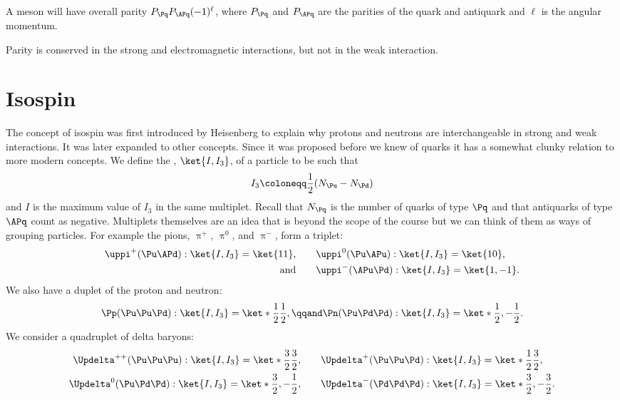 \documentclass[fleqn]{NotesClass}
\makeatletter
\newcommand{\PBASE@pion}{\uppi}
\newcommand{\Ppiplus}{\ensuremath{\PBASE@pion^+}}
\newcommand{\Ppiminus}{\ensuremath{\PBASE@pion^-}}
\newcommand{\Ppineutral}{\ensuremath{\PBASE@pion^0}}
\newcommand{\Ppizero}{\Ppineutral}
\newcommand{\PBASE@Delta}{\Updelta}
\newcommand{\PDeltazero}{\ensuremath{\PBASE@Delta^0}}
\newcommand{\PDeltapp}{\ensuremath{\PBASE@Delta^{++}}}
\newcommand{\PDeltap}{\ensuremath{\PBASE@Delta^+}}
\newcommand{\PDeltam}{\ensuremath{\PBASE@Delta^-}}
\makeatother
\begin{document}
    A meson will have overall parity \(P_{\Pq}P_{\APq}(-1)^{\ell}\), where \(P_{\Pq}\) and \(P_{\APq}\) are the parities of the quark and antiquark and \(\ell\) is the angular momentum.
    
    Parity is conserved in the strong and electromagnetic interactions, but not in the weak interaction.
    
    \section{Isospin}
    The concept of isospin was first introduced by Heisenberg to explain why protons and neutrons are interchangeable in strong and weak interactions.
    It was later expanded to other concepts.
    Since it was proposed before we knew of quarks it has a somewhat clunky relation to more modern concepts.
    We define the , \(\ket{I,I_3}\), of a particle to be such that
    \begin{equation}
        I_3 \coloneqq \frac{1}{2}(N_{\Pu} - N_{\Pd})
    \end{equation}
    and \(I\) is the maximum value of \(I_3\) in the same multiplet.
    Recall that \(N_{\Pq}\) is the number of quarks of type \(\Pq\) and that antiquarks of type \(\APq\) count as negative.
    Multiplets themselves are an idea that is beyond the scope of the course but we can think of them as ways of grouping particles.
    For example the pions, \Ppiplus, \Ppizero, and \Ppiminus, form a triplet:
    \begin{align}
        \Ppiplus (\Pu\APd): \ket{I, I_3} = \ket{11}, \qquad &\Ppizero (\Pu\APu): \ket{I, I_3} = \ket{10},\\
        \text{and}\qquad &\Ppiminus (\APu\Pd): \ket{I, I_3} = \ket{1,{-1}}.
    \end{align}
    We also have a duplet of the proton and neutron:
    \begin{equation}
        \Pp (\Pu\Pu\Pd): \ket{I, I_3} = \ket*{\frac{1}{2}\frac{1}{2}}, \qqand \Pn (\Pu\Pd\Pd): \ket{I, I_3} = \ket*{\frac{1}{2},-\frac{1}{2}}.
    \end{equation}
    We consider a quadruplet of delta baryons:
    \begin{align}
        \PDeltapp(\Pu\Pu\Pu) : \ket{I,I_3} = \ket*{\frac{3}{2}\frac{3}{2}}, \qquad & \PDeltap(\Pu\Pu\Pd) : \ket{I,I_3} = \ket*{\frac{1}{2}\frac{3}{2}},\\
        \PDeltazero(\Pu\Pd\Pd) : \ket{I,I_3} = \ket*{\frac{3}{2},-\frac{1}{2}}, \qquad & \PDeltam(\Pd\Pd\Pd) : \ket{I,I_3} = \ket*{\frac{3}{2},-\frac{3}{2}}.
    \end{align}
    
\end{document}
